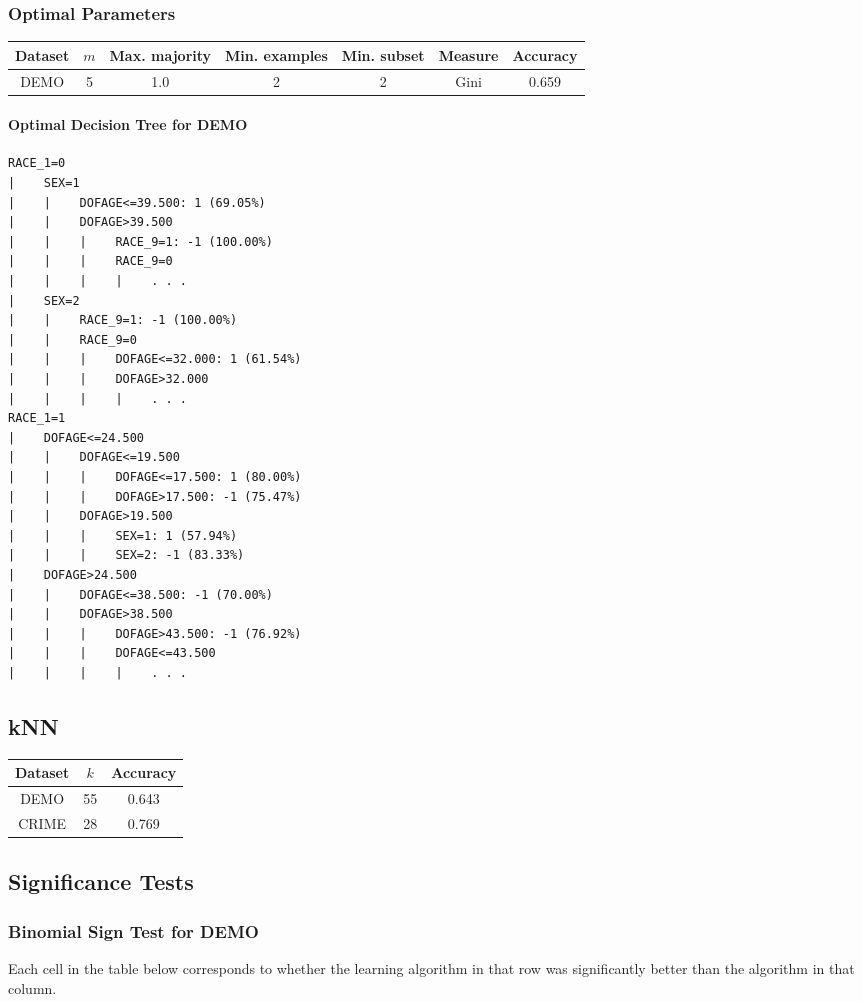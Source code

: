 \documentclass[]{article}
\begin{document}
\subsubsection{Optimal Parameters}

\begin{tabular}{|c|c|c|c|c|c|c|}
\hline
Dataset & $m$ & Max. majority & Min. examples & Min. subset & Measure & Accuracy \\
\hline
DEMO & 5 & 1.0 & 2 & 2 & Gini & 0.659 \\
\hline
\end{tabular}

\paragraph{Optimal Decision Tree for DEMO} %
\begin{verbatim}
RACE_1=0
|    SEX=1
|    |    DOFAGE<=39.500: 1 (69.05%)
|    |    DOFAGE>39.500
|    |    |    RACE_9=1: -1 (100.00%)
|    |    |    RACE_9=0
|    |    |    |    . . .
|    SEX=2
|    |    RACE_9=1: -1 (100.00%)
|    |    RACE_9=0
|    |    |    DOFAGE<=32.000: 1 (61.54%)
|    |    |    DOFAGE>32.000
|    |    |    |    . . .
RACE_1=1
|    DOFAGE<=24.500
|    |    DOFAGE<=19.500
|    |    |    DOFAGE<=17.500: 1 (80.00%)
|    |    |    DOFAGE>17.500: -1 (75.47%)
|    |    DOFAGE>19.500
|    |    |    SEX=1: 1 (57.94%)
|    |    |    SEX=2: -1 (83.33%)
|    DOFAGE>24.500
|    |    DOFAGE<=38.500: -1 (70.00%)
|    |    DOFAGE>38.500
|    |    |    DOFAGE>43.500: -1 (76.92%)
|    |    |    DOFAGE<=43.500
|    |    |    |    . . .
\end{verbatim}

\subsection{kNN}
\begin{tabular}{|c|c|c|}
\hline
Dataset & $k$ & Accuracy \\
\hline
DEMO & 55 & 0.643 \\
CRIME & 28 & 0.769 \\
\hline
\end{tabular}


\subsection{Significance Tests}

\subsubsection{Binomial Sign Test for DEMO}
Each cell in the table below corresponds to whether the learning algorithm in that row was significantly better than the algorithm in that column.
\end{document}

